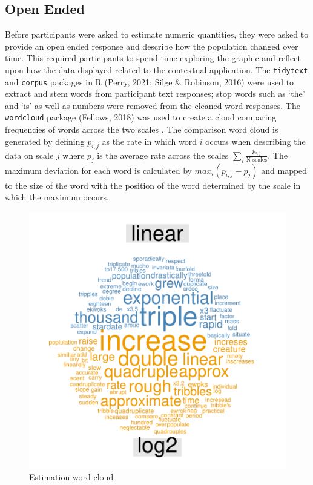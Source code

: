 \documentclass[print]{nuthesis}
\begin{document}
\hypertarget{open-ended}{%
\subsection{Open Ended}\label{open-ended}}

Before participants were asked to estimate numeric quantities, they were asked to provide an open ended response and describe how the population changed over time.
This required participants to spend time exploring the graphic and reflect upon how the data displayed related to the contextual application.
The \texttt{tidytext} and \texttt{corpus} packages in R (Perry, 2021; Silge \& Robinson, 2016) were used to extract and stem words from participant text responses; stop words such as `the' and `is' as well as numbers were removed from the cleaned word responses.
The \texttt{wordcloud} package (Fellows, 2018) was used to create a cloud comparing frequencies of words across the two scales .
The comparison word cloud is generated by defining \(p_{i,j}\) as the rate in which word \(i\) occurs when describing the data on scale \(j\) where \(p_j\) is the average rate across the scales \(\sum_i{\frac{p_{i,j}}{\text{N scales}}}\).
The maximum deviation for each word is calculated by \(max_i(p_{i,j} - p_j)\) and mapped to the size of the word with the position of the word determined by the scale in which the maximum occurs.

\begin{figure}[tbp]

{\centering \includegraphics[width=0.75\linewidth,]{thesis_files/figure-latex/estimation-word-cloud-1} 

}

\caption{Estimation word cloud}\label{fig:estimation-word-cloud}
\end{figure}
\end{document}
